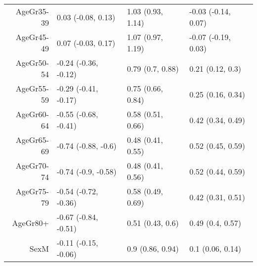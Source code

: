 \begin{table}[ht]
\begin{tabular}{rlll}
  AgeGr35-39 & 0.03 (-0.08, 0.13) & 1.03 (0.93, 1.14) & -0.03 (-0.14, 0.07) \\ 
  AgeGr45-49 & 0.07 (-0.03, 0.17) & 1.07 (0.97, 1.19) & -0.07 (-0.19, 0.03) \\ 
  AgeGr50-54 & -0.24 (-0.36, -0.12) & 0.79 (0.7, 0.88) & 0.21 (0.12, 0.3) \\ 
  AgeGr55-59 & -0.29 (-0.41, -0.17) & 0.75 (0.66, 0.84) & 0.25 (0.16, 0.34) \\ 
  AgeGr60-64 & -0.55 (-0.68, -0.41) & 0.58 (0.51, 0.66) & 0.42 (0.34, 0.49) \\ 
  AgeGr65-69 & -0.74 (-0.88, -0.6) & 0.48 (0.41, 0.55) & 0.52 (0.45, 0.59) \\ 
  AgeGr70-74 & -0.74 (-0.9, -0.58) & 0.48 (0.41, 0.56) & 0.52 (0.44, 0.59) \\ 
  AgeGr75-79 & -0.54 (-0.72, -0.36) & 0.58 (0.49, 0.69) & 0.42 (0.31, 0.51) \\ 
  AgeGr80+ & -0.67 (-0.84, -0.51) & 0.51 (0.43, 0.6) & 0.49 (0.4, 0.57) \\ 
  SexM & -0.11 (-0.15, -0.06) & 0.9 (0.86, 0.94) & 0.1 (0.06, 0.14) \\ 
   \hline
\end{tabular}
\end{table}
